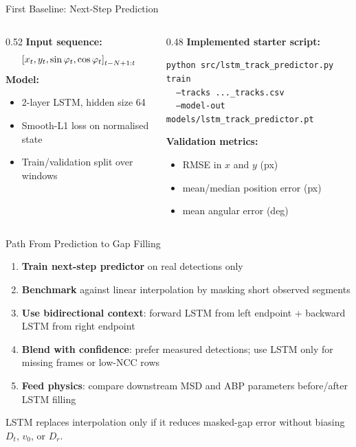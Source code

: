 \begin{frame}{First Baseline: Next-Step Prediction}
\begin{columns}
\begin{column}{0.52\textwidth}
\textbf{Input sequence:}
\begin{equation*}\small
    \left[x_t, y_t, \sin\varphi_t, \cos\varphi_t\right]_{t-N+1:t}
\end{equation*}
\textbf{Model:}
\begin{itemize}\small
    \item 2-layer LSTM, hidden size 64
    \item Smooth-L1 loss on normalised state
    \item Train/validation split over windows
\end{itemize}
\end{column}
\begin{column}{0.48\textwidth}
\textbf{Implemented starter script:}
\begin{mynote}
\footnotesize
\texttt{python src/lstm\_track\_predictor.py train}\\
\texttt{\ \ --tracks ...\_tracks.csv}\\
\texttt{\ \ --model-out models/lstm\_track\_predictor.pt}
\end{mynote}
\smallskip
\textbf{Validation metrics:}
\begin{itemize}\small
    \item RMSE in $x$ and $y$ (px)
    \item mean/median position error (px)
    \item mean angular error (deg)
\end{itemize}
\end{column}
\end{columns}
\end{frame}

\begin{frame}{Path From Prediction to Gap Filling}
\begin{enumerate}\small
    \item \textbf{Train next-step predictor} on real detections only
    \item \textbf{Benchmark} against linear interpolation by masking short observed segments
    \item \textbf{Use bidirectional context}: forward LSTM from left endpoint + backward LSTM from right endpoint
    \item \textbf{Blend with confidence}: prefer measured detections; use LSTM only for missing frames or low-NCC rows
    \item \textbf{Feed physics}: compare downstream MSD and ABP parameters before/after LSTM filling
\end{enumerate}
\smallskip
\begin{myalert}
\small LSTM replaces interpolation only if it reduces masked-gap error without biasing $D_t$, $v_0$, or $D_r$.
\end{myalert}
\end{frame}
